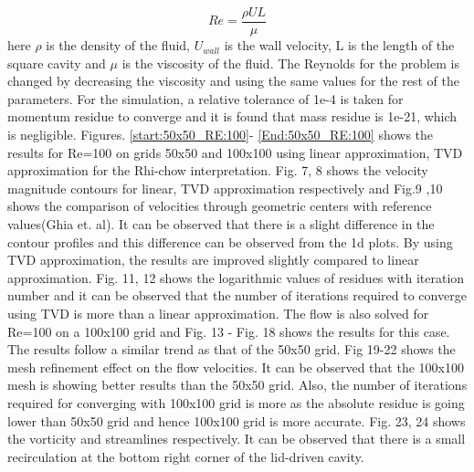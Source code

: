 \documentclass[12pt]{elsarticle}
\begin{document}
	\begin{equation}
		Re=\frac{\rho U L}{\mu}
	\end{equation}
	here $\rho$ is the density of the fluid, $U_{wall}$ is the wall velocity, L is the length of the square cavity and $\mu$ is the viscosity of the fluid. The Reynolds for the problem is changed by decreasing the viscosity and using the same values for the rest of the parameters. For the simulation, a relative tolerance of 1e-4 is taken for momentum residue to converge and it is found that mass residue is 1e-21, which is negligible.  \newline
	\newline
	Figures. \ref{start:50x50_RE:100}- \ref{End:50x50_RE:100} shows the results for Re=100 on grids 50x50 and 100x100 using linear approximation, TVD approximation for the Rhi-chow interpretation.\newline
	\newline
	Fig. 7, 8 shows the velocity magnitude contours for linear,  TVD approximation respectively and Fig.9 ,10 shows the comparison of velocities through geometric centers with reference values(Ghia et. al). It can be observed that there is a slight difference in the contour profiles and this difference can be observed from the 1d plots. By using TVD approximation, the results are improved slightly compared to linear approximation. Fig. 11, 12 shows the logarithmic values of residues with iteration number and it can be observed that the number of iterations required to converge using TVD is more than a linear approximation. \newline
	\newline
	The flow is also solved for Re=100 on a 100x100 grid and Fig. 13 - Fig. 18 shows the results for this case. The results follow a similar trend as that of the 50x50 grid.  Fig 19-22 shows the mesh refinement effect on the flow velocities. It can be observed that the 100x100 mesh is showing better results than the 50x50 grid. Also, the number of iterations required for converging with 100x100 grid is more as the absolute residue is going lower than 50x50 grid and hence 100x100 grid is more accurate. Fig. 23, 24 shows the vorticity and streamlines respectively. It can be observed that there is a small recirculation at the bottom right corner of the lid-driven cavity. 
	
\end{document}
